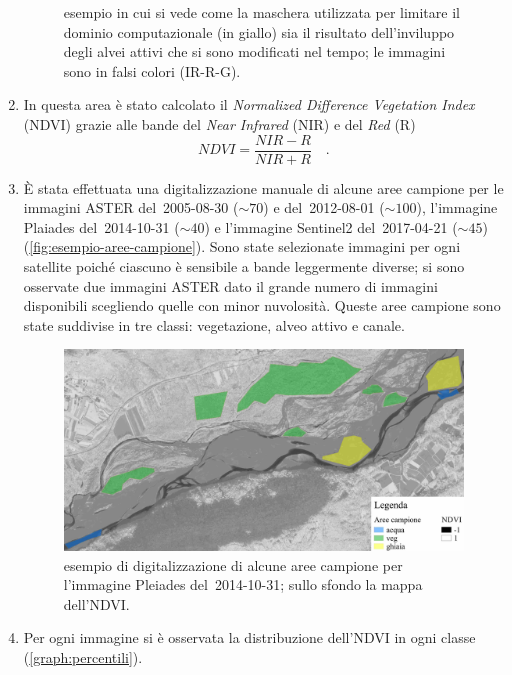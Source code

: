 \documentclass[12pt,a4paper,italian,twoside]{scrbook}
\begin{document}
\begin{enumerate}
\begin{figure}[t]
			{esempio in cui si vede come la maschera utilizzata per limitare il dominio computazionale (in giallo) sia il risultato dell'inviluppo degli alvei attivi che si sono modificati nel tempo; le immagini sono in falsi colori (IR-R-G).}
		\label{fig:esempio-maschera}
	\end{figure}
	\item In questa area è stato calcolato il \emph{Normalized Difference Vegetation Index} (NDVI) grazie alle bande del \emph{Near Infrared} (NIR) e del \emph{Red} (R)
	\begin{equation}
		NDVI = \frac{NIR - R}{NIR + R} \quad .
		\label{eq:ndvi}
	\end{equation}
	\item \`{E} stata effettuata una digitalizzazione manuale di alcune aree campione per le immagini ASTER del~2005-08-30 ($\sim 70$) e del~2012-08-01 ($\sim 100$), l'immagine Plaiades del~2014-10-31 ($\sim 40$) e l'immagine Sentinel2 del~2017-04-21 ($\sim 45$) (\vref{fig:esempio-aree-campione}).
	Sono state selezionate immagini per ogni satellite poiché ciascuno è sensibile a bande leggermente diverse; si sono osservate due immagini ASTER dato il grande numero di immagini disponibili scegliendo quelle con minor nuvolosità.
	Queste aree campione sono state suddivise in tre classi: vegetazione, alveo attivo e canale.
	\begin{figure}[ht]
		\centering
		\includegraphics[width=\textwidth]{files/esempio_aree_campione_2014_10_31.jpeg}
		\caption[esempio di aree campione per calcolare la distribuzione dell'NDVI]{esempio di digitalizzazione di alcune aree campione per l'immagine Pleiades del~2014-10-31; sullo sfondo la mappa dell'NDVI.}
		\label{fig:esempio-aree-campione}
	\end{figure}
	\item Per ogni immagine si è osservata la distribuzione dell'NDVI in ogni classe (\vref{graph:percentili}).

\end{enumerate}
\end{document}

